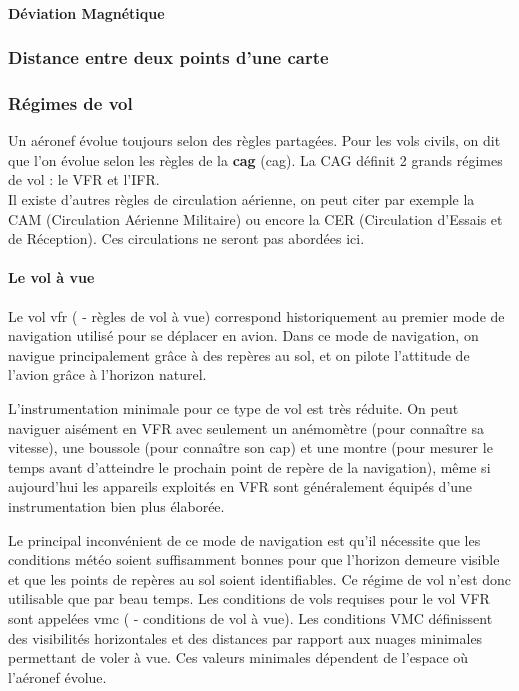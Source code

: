 		\paragraph{Déviation Magnétique}
		
		\subsubsection{Distance entre deux points d'une carte}
		
		\subsubsection{Régimes de vol}
		Un aéronef évolue toujours selon des règles partagées. Pour les vols civils, on dit que l'on évolue selon les règles de la \textbf{\acrlong{cag}}	(\acrshort{cag}). La CAG définit 2 grands régimes de vol : le VFR et l'IFR.\\
		
		Il existe d'autres règles de circulation aérienne, on peut citer par exemple la CAM (Circulation Aérienne Militaire) ou encore la CER (Circulation d'Essais et de Réception). Ces circulations ne seront pas abordées ici.
		
		\paragraph{Le vol à vue}
		Le vol \acrshort{vfr} ( - règles de vol à vue) correspond historiquement au premier mode de navigation utilisé pour se déplacer en avion. Dans ce mode de navigation, on navigue principalement grâce à des repères au sol, et on pilote l'attitude de l'avion grâce à l'horizon naturel. 
		
		L'instrumentation minimale pour ce type de vol est très réduite. On peut naviguer aisément en VFR avec seulement un anémomètre (pour connaître sa vitesse), une boussole (pour connaître son cap) et une montre (pour mesurer le temps avant d'atteindre le prochain point de repère de la navigation), même si aujourd'hui les appareils exploités en VFR sont généralement équipés d'une instrumentation bien plus élaborée.
		
		
		Le principal inconvénient de ce mode de navigation est qu'il nécessite que les conditions météo soient suffisamment bonnes pour que l'horizon demeure visible et que les points de repères au sol soient identifiables. Ce régime de vol n'est donc utilisable que par beau temps. Les conditions de vols requises pour le vol VFR sont appelées \acrshort{vmc} ( - conditions de vol à vue). Les conditions VMC définissent des visibilités horizontales et des distances par rapport aux nuages minimales permettant de voler à vue. Ces valeurs minimales dépendent de l'espace où l'aéronef évolue.
		
